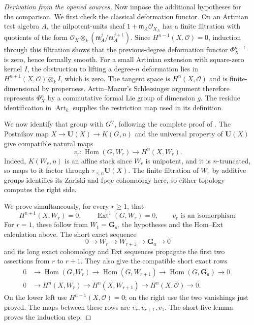 \begin{proof}[Derivation from the opened sources]
Now impose the additional hypotheses for the comparison.  We first
check the classical deformation functor.  On an Artinian test algebra
$A$, the nilpotent-units sheaf $1+\mathfrak m_A\mathcal O_{X_A}$ has
a finite filtration with quotients of the form
$\mathcal O_X\otimes_k(\mathfrak m_A^j/\mathfrak m_A^{j+1})$.
Since $H^{n-1}(X,\mathcal O)=0$, induction through this filtration
shows that the previous-degree deformation functor $\Phi_X^{n-1}$
is zero, hence formally smooth.  For a small Artinian extension with
square-zero kernel $I$, the obstruction to lifting a degree-$n$
deformation lies in $H^{n+1}(X,\mathcal O)\otimes_k I$, which is zero.
The tangent space is $H^n(X,\mathcal O)$ and is finite-dimensional by
properness.  Artin--Mazur's Schlessinger argument
\cite[II, Corollaries~2.4, 2.5, 2.11--2.12; II, Corollary~4.2,
pp.~106--109]{CArtinMazur1977}
therefore represents $\Phi_X^n$ by a commutative formal Lie group of
dimension $g$.  The residue identification in
$\operatorname{Art}_k$ supplies the restriction map used in its
definition.

We now identify that group with $G^\vee$, following the complete
proof of \cite[Proposition~6.3.6, pp.~77--78]{BMondalReinecke2026}.
The Postnikov map $X\to\mathbf U(X)\to K(G,n)$ and the universal
property of $\mathbf U(X)$ give compatible natural maps
\[
 v_r:\operatorname{Hom}(G,W_r)\longrightarrow H^n(X,W_r).
\]
Indeed, $K(W_r,n)$ is an affine stack since $W_r$ is unipotent, and
it is $n$-truncated, so maps to it factor through
$\tau_{\leq n}\mathbf U(X)$.
The finite filtration of $W_r$ by additive groups identifies its
Zariski and fpqc cohomology here, so either topology computes the
right side.

We prove simultaneously, for every $r\geq1$, that
\[
 H^{n+1}(X,W_r)=0,
 \qquad\operatorname{Ext}^1(G,W_r)=0,
 \qquad v_r\text{ is an isomorphism}.
\]
For $r=1$, these follow from $W_1=\mathbf G_a$, the hypotheses and
the Hom--Ext calculation above.  The short exact sequence
\[
 0\longrightarrow W_r\longrightarrow W_{r+1}
 \longrightarrow\mathbf G_a\longrightarrow0
\]
and its long exact cohomology and Ext sequences propagate the first
two assertions from $r$ to $r+1$.  They also give the compatible
short exact rows
\[
\begin{aligned}
0&\longrightarrow\operatorname{Hom}(G,W_r)
 \longrightarrow\operatorname{Hom}(G,W_{r+1})
 \longrightarrow\operatorname{Hom}(G,\mathbf G_a)
 \longrightarrow0,\\
0&\longrightarrow H^n(X,W_r)
 \longrightarrow H^n(X,W_{r+1})
 \longrightarrow H^n(X,\mathcal O)
 \longrightarrow0.
\end{aligned}
\]
On the lower left use $H^{n-1}(X,\mathcal O)=0$; on the right use
the two vanishings just proved.  The maps between these rows are
$v_r,v_{r+1},v_1$.  The short five lemma proves the induction step.


\end{proof}
